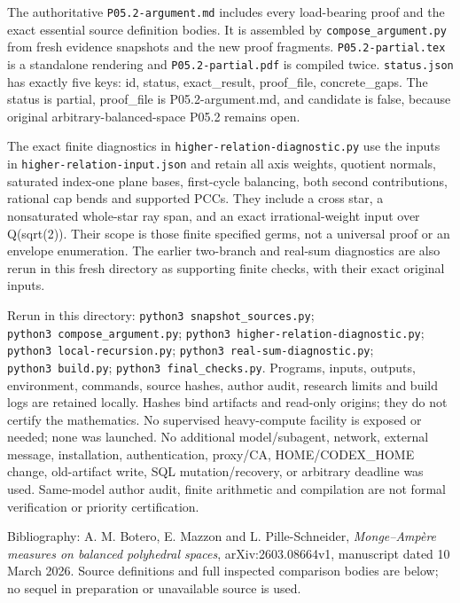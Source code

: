 \documentclass[
  11pt,
]{article}
\begin{document}
The authoritative \texttt{P05.2-argument.md} includes every load-bearing
proof and the exact essential source definition bodies. It is assembled
by \texttt{compose\_argument.py} from fresh evidence snapshots and the
new proof fragments. \texttt{P05.2-partial.tex} is a standalone
rendering and \texttt{P05.2-partial.pdf} is compiled twice.
\texttt{status.json} has exactly five keys: id, status, exact\_result,
proof\_file, concrete\_gaps. The status is partial, proof\_file is
P05.2-argument.md, and candidate is false, because original
arbitrary-balanced-space P05.2 remains open.

The exact finite diagnostics in \texttt{higher-relation-diagnostic.py}
use the inputs in \texttt{higher-relation-input.json} and retain all
axis weights, quotient normals, saturated index-one plane bases,
first-cycle balancing, both second contributions, rational cap bends and
supported PCCs. They include a cross star, a nonsaturated whole-star ray
span, and an exact irrational-weight input over Q(sqrt(2)). Their scope
is those finite specified germs, not a universal proof or an envelope
enumeration. The earlier two-branch and real-sum diagnostics are also
rerun in this fresh directory as supporting finite checks, with their
exact original inputs.

Rerun in this directory: \texttt{python3\ snapshot\_sources.py};
\texttt{python3\ compose\_argument.py};
\texttt{python3\ higher-relation-diagnostic.py};
\texttt{python3\ local-recursion.py};
\texttt{python3\ real-sum-diagnostic.py}; \texttt{python3\ build.py};
\texttt{python3\ final\_checks.py}. Programs, inputs, outputs,
environment, commands, source hashes, author audit, research limits and
build logs are retained locally. Hashes bind artifacts and read-only
origins; they do not certify the mathematics. No supervised
heavy-compute facility is exposed or needed; none was launched. No
additional model/subagent, network, external message, installation,
authentication, proxy/CA, HOME/CODEX\_HOME change, old-artifact write,
SQL mutation/recovery, or arbitrary deadline was used. Same-model author
audit, finite arithmetic and compilation are not formal verification or
priority certification.

Bibliography: A. M. Botero, E. Mazzon and L. Pille-Schneider,
\emph{Monge--Ampère measures on balanced polyhedral spaces},
arXiv:2603.08664v1, manuscript dated 10 March 2026. Source definitions
and full inspected comparison bodies are below; no sequel in preparation
or unavailable source is used.
\end{document}
